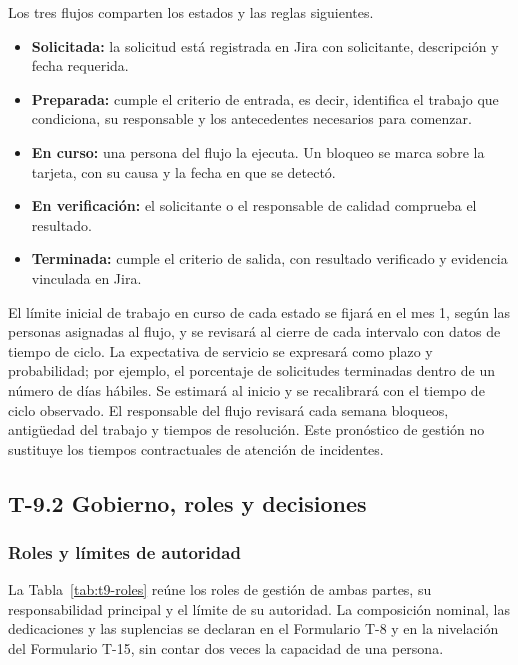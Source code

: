 \documentclass[11pt]{article}
\providecommand{\tightlist}{%
  \setlength{\itemsep}{0pt}\setlength{\parskip}{0pt}}
\begin{document}
Los tres flujos comparten los estados y las reglas siguientes.

\begin{itemize}
\tightlist
\item
  \textbf{Solicitada:} la solicitud está registrada en Jira con solicitante, descripción y fecha requerida.
\item
  \textbf{Preparada:} cumple el criterio de entrada, es decir, identifica el trabajo que condiciona, su responsable y los antecedentes necesarios para comenzar.
\item
  \textbf{En curso:} una persona del flujo la ejecuta. Un bloqueo se marca sobre la tarjeta, con su causa y la fecha en que se detectó.
\item
  \textbf{En verificación:} el solicitante o el responsable de calidad comprueba el resultado.
\item
  \textbf{Terminada:} cumple el criterio de salida, con resultado verificado y evidencia vinculada en Jira.
\end{itemize}

El límite inicial de trabajo en curso de cada estado se fijará en el mes 1, según las personas asignadas al flujo, y se revisará al cierre de cada intervalo con datos de tiempo de ciclo. La expectativa de servicio se expresará como plazo y probabilidad; por ejemplo, el porcentaje de solicitudes terminadas dentro de un número de días hábiles. Se estimará al inicio y se recalibrará con el tiempo de ciclo observado. El responsable del flujo revisará cada semana bloqueos, antigüedad del trabajo y tiempos de resolución. Este pronóstico de gestión no sustituye los tiempos contractuales de atención de incidentes.

\subsection{T-9.2 Gobierno, roles y decisiones}\label{t9-2}

\subsubsection{Roles y límites de autoridad}\label{t9-2-roles}

La Tabla~\mbox{\ref{tab:t9-roles}} reúne los roles de gestión de ambas partes, su responsabilidad principal y el límite de su autoridad. La composición nominal, las dedicaciones y las suplencias se declaran en el Formulario T-8 y en la nivelación del Formulario T-15, sin contar dos veces la capacidad de una persona.
\end{document}
